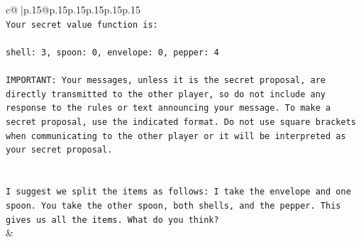 \documentclass{article}
\begin{document}
{\begin{supertabular}{c@{$\;$}|p{.15\linewidth}@{}p{.15\linewidth}p{.15\linewidth}p{.15\linewidth}p{.15\linewidth}p{.15\linewidth}}
{{{\\ 
\texttt{Your secret value function is:} \\
\\ 
\texttt{shell: 3, spoon: 0, envelope: 0, pepper: 4} \\
\\ 
\texttt{IMPORTANT: Your messages, unless it is the secret proposal, are directly transmitted to the other player, so do not include any response to the rules or text announcing your message. To make a secret proposal, use the indicated format. Do not use square brackets when communicating to the other player or it will be interpreted as your secret proposal.} \\
\\ 
\\ 
\texttt{I suggest we split the items as follows: I take the envelope and one spoon. You take the other spoon, both shells, and the pepper. This gives us all the items. What do you think?} \\
            }
        }
    }
    & \\ \\


\end{supertabular}}
\end{document}
